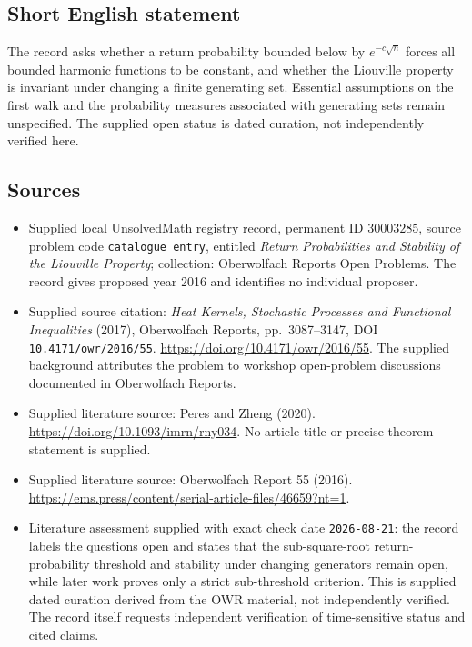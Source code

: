 \documentclass[11pt]{article}
\begin{document}
\subsection{Short English statement}
The record asks whether a return probability bounded below by \(e^{-c\sqrt n}\) forces all bounded harmonic functions to be constant, and whether the Liouville property is invariant under changing a finite generating set. Essential assumptions on the first walk and the probability measures associated with generating sets remain unspecified. The supplied open status is dated curation, not independently verified here.
\subsection{Sources}
\begin{itemize}
\item Supplied local UnsolvedMath registry record, permanent ID \(30003285\), source problem code \texttt{catalogue entry}, entitled \emph{Return Probabilities and Stability of the Liouville Property}; collection: Oberwolfach Reports Open Problems. The record gives proposed year 2016 and identifies no individual proposer.
\item Supplied source citation: \emph{Heat Kernels, Stochastic Processes and Functional Inequalities} (2017), Oberwolfach Reports, pp.~3087--3147, DOI \texttt{10.4171/owr/2016/55}. \url{https://doi.org/10.4171/owr/2016/55}. The supplied background attributes the problem to workshop open-problem discussions documented in Oberwolfach Reports.
\item Supplied literature source: Peres and Zheng (2020). \url{https://doi.org/10.1093/imrn/rny034}. No article title or precise theorem statement is supplied.
\item Supplied literature source: Oberwolfach Report 55 (2016). \url{https://ems.press/content/serial-article-files/46659?nt=1}.
\item Literature assessment supplied with exact check date \texttt{2026-08-21}: the record labels the questions open and states that the sub-square-root return-probability threshold and stability under changing generators remain open, while later work proves only a strict sub-threshold criterion. This is supplied dated curation derived from the OWR material, not independently verified. The record itself requests independent verification of time-sensitive status and cited claims.
\end{itemize}
\end{document}
